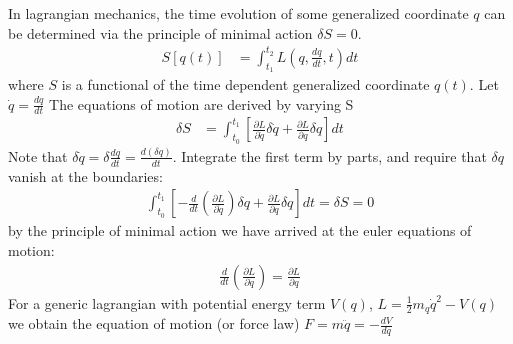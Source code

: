 In lagrangian mechanics, the time evolution of some generalized coordinate $q$ can
 be determined via the principle of minimal action $\delta S = 0$. 
\begin{align*}
S[q(t)] &= \int_{t_1}^{t_2} L \left(q,\frac{dq}{dt},t\right) dt
\end{align*}
where $S$ is a functional of the time dependent generalized coordinate $q(t)$. 
Let $\dot{q} = \frac{dq}{dt}$ The equations of motion are derived by varying S
\begin{align*}
\delta S &= \int_{t_0}^{t_1} \left [ \frac{\partial L}{\partial \dot q}  \delta \dot q + \frac{\partial L}{\partial q} \delta q \right ]dt 
\end{align*}
Note that $\delta \dot q = \delta\frac{dq}{dt} = \frac{d(\delta q)}{dt}$. 
Integrate the first term by parts, and require that $\delta q$ vanish at the boundaries:
\begin{align*}
\int_{t_0}^{t_1} \left [-\frac{d}{dt}\left (\frac{\partial L}{\partial \dot q} \right) \delta q + \frac{\partial L}{\partial q} \delta q \right ] dt  = \delta S = 0
\end{align*}
by the principle of minimal action we have arrived at the euler equations of motion:
\begin{align*}
\frac{d}{dt}\left (\frac{\partial L}{\partial \dot q} \right) = \frac{\partial L}{\partial q}  
\end{align*}
For a generic lagrangian with potential energy term $V(q)$, $L=\frac{1}{2}m_q \dot q^{2} - V(q)$  we obtain the equation of motion (or force law) $F=m\ddot{q}=-\frac{dV}{dq}$ 
